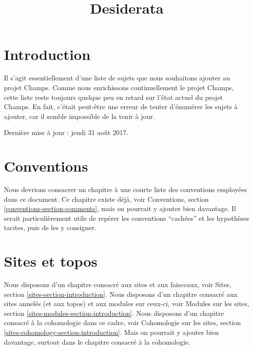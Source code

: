 

%


\title{Desiderata}

\maketitle

\label{section-phantom}


\tableofcontents

\section{Introduction}
\label{section-introduction}

\noindent
Il s'agit essentiellement d'une liste de sujets que nous souhaitons ajouter au
projet Champs. Comme nous enrichissons continuellement le projet Champs, cette liste reste
toujours quelque peu en retard sur l'état actuel du projet Champs. En fait, c'était peut-être
une erreur de tenter d'énumérer les sujets à ajouter, car il semble
impossible de la tenir à jour.

\medskip\noindent
Dernière mise à jour : jeudi 31 août 2017.


\section{Conventions}
\label{section-conventions}

\noindent
Nous devrions consacrer un chapitre à une courte liste des conventions employées dans ce document.
Ce chapitre existe déjà, voir
Conventions, section \ref{conventions-section-comments},
mais on pourrait y ajouter bien davantage. Il serait particulièrement utile de repérer
les conventions ``cachées'' et les hypothèses tacites, puis de les y consigner.


\section{Sites et topos}
\label{section-sites}

\noindent
Nous disposons d'un chapitre consacré aux sites et aux faisceaux, voir
Sites, section \ref{sites-section-introduction}.
Nous disposons d'un chapitre consacré aux sites annelés (et aux topos) et aux modules sur ceux-ci, voir
Modules sur les sites, section \ref{sites-modules-section-introduction}.
Nous disposons d'un chapitre consacré à la cohomologie dans ce cadre, voir
Cohomologie sur les sites, section \ref{sites-cohomology-section-introduction}.
Mais on pourrait y ajouter bien davantage, surtout dans le chapitre consacré à la cohomologie.


